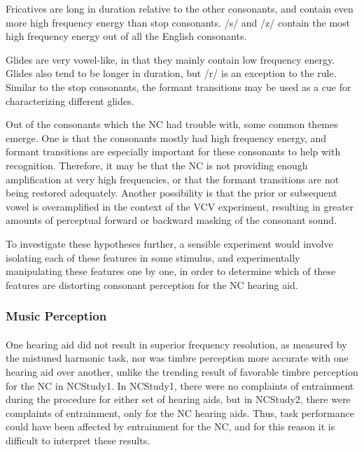 Fricatives are long in duration relative to the other consonants, and contain even more high frequency energy than stop consonants.  /s/ and /z/ contain the most high frequency energy out of all the English consonants.

Glides are very vowel-like, in that they mainly contain low frequency energy.  Glides also tend to be longer in duration, but /r/ is an exception to the rule.  Similar to the stop consonants, the formant transitions may be used as a cue for characterizing different glides.

Out of the consonants which the NC had trouble with, some common themes emerge.  One is that  the consonants mostly had high frequency energy, and formant transitions are especially important for these consonants to help with recognition. Therefore, it may be that the NC is not providing enough amplification at very high frequencies, or that the formant transitions are not being restored adequately.  Another possibility is that the prior or subsequent vowel is overamplified in the context of the VCV experiment, resulting in greater amounts of perceptual forward or backward masking of the consonant sound.

To investigate these hypotheses further, a sensible experiment would involve isolating each of these features in some stimulus, and experimentally manipulating these features one by one, in order to determine which of these features are distorting consonant perception for the NC hearing aid.

\subsubsection{Music Perception}
\paragraph{}One hearing aid did not result in superior frequency resolution, as measured by the mistuned harmonic task, nor was timbre perception more accurate with one hearing aid over another, unlike the trending result of favorable timbre perception for the NC in NCStudy1.  In NCStudy1, there were no complaints of entrainment during the procedure for either set of hearing aids, but in NCStudy2, there were complaints of entrainment, only for the NC hearing aids.  Thus, task performance could have been affected by entrainment for the NC, and for this reason it is difficult to interpret these results.

